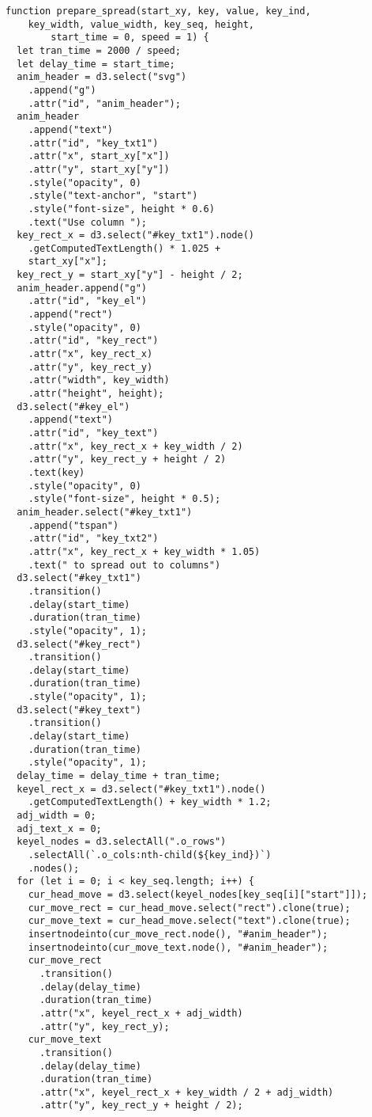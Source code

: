 \begin{lstlisting}
function prepare_spread(start_xy, key, value, key_ind, 
    key_width, value_width, key_seq, height, 
        start_time = 0, speed = 1) {
  let tran_time = 2000 / speed;
  let delay_time = start_time;
  anim_header = d3.select("svg")
    .append("g")
    .attr("id", "anim_header");
  anim_header
    .append("text")
    .attr("id", "key_txt1")
    .attr("x", start_xy["x"])
    .attr("y", start_xy["y"])
    .style("opacity", 0)
    .style("text-anchor", "start")
    .style("font-size", height * 0.6)
    .text("Use column ");
  key_rect_x = d3.select("#key_txt1").node()
    .getComputedTextLength() * 1.025 +
    start_xy["x"];
  key_rect_y = start_xy["y"] - height / 2;
  anim_header.append("g")
    .attr("id", "key_el")
    .append("rect")
    .style("opacity", 0)
    .attr("id", "key_rect")
    .attr("x", key_rect_x)
    .attr("y", key_rect_y)
    .attr("width", key_width)
    .attr("height", height);
  d3.select("#key_el")
    .append("text")
    .attr("id", "key_text")
    .attr("x", key_rect_x + key_width / 2)
    .attr("y", key_rect_y + height / 2)
    .text(key)
    .style("opacity", 0)
    .style("font-size", height * 0.5);
  anim_header.select("#key_txt1")
    .append("tspan")
    .attr("id", "key_txt2")
    .attr("x", key_rect_x + key_width * 1.05)
    .text(" to spread out to columns")
  d3.select("#key_txt1")
    .transition()
    .delay(start_time)
    .duration(tran_time)
    .style("opacity", 1);
  d3.select("#key_rect")
    .transition()
    .delay(start_time)
    .duration(tran_time)
    .style("opacity", 1);
  d3.select("#key_text")
    .transition()
    .delay(start_time)
    .duration(tran_time)
    .style("opacity", 1);
  delay_time = delay_time + tran_time;
  keyel_rect_x = d3.select("#key_txt1").node()
    .getComputedTextLength() + key_width * 1.2;
  adj_width = 0;
  adj_text_x = 0;
  keyel_nodes = d3.selectAll(".o_rows")
    .selectAll(`.o_cols:nth-child(${key_ind})`)
    .nodes();
  for (let i = 0; i < key_seq.length; i++) {
    cur_head_move = d3.select(keyel_nodes[key_seq[i]["start"]]);
    cur_move_rect = cur_head_move.select("rect").clone(true);
    cur_move_text = cur_head_move.select("text").clone(true);
    insertnodeinto(cur_move_rect.node(), "#anim_header");
    insertnodeinto(cur_move_text.node(), "#anim_header");
    cur_move_rect
      .transition()
      .delay(delay_time)
      .duration(tran_time)
      .attr("x", keyel_rect_x + adj_width)
      .attr("y", key_rect_y);
    cur_move_text
      .transition()
      .delay(delay_time)
      .duration(tran_time)
      .attr("x", keyel_rect_x + key_width / 2 + adj_width)
      .attr("y", key_rect_y + height / 2);

\end{lstlisting}
